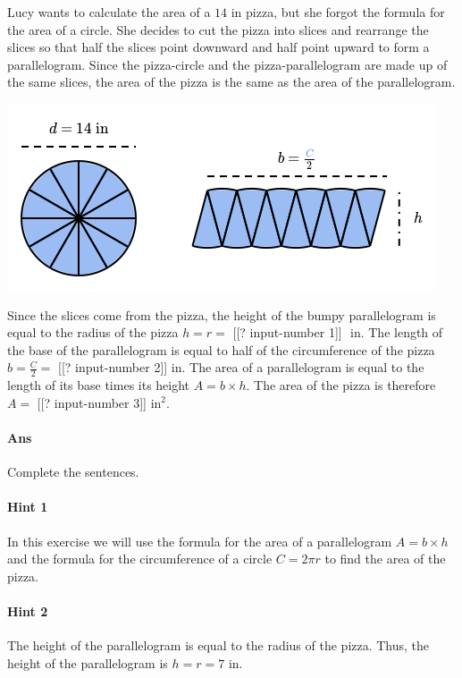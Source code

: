 \documentclass[twocolumn,10pt]{article}
\def\shrinkfactor{0.45}
\begin{document}
\noindent
Lucy wants to calculate the area of a $14\text{ in}$ pizza, but she forgot the formula for the area of a circle. She decides to cut the pizza into slices and rearrange the slices so that half the slices point downward and half point upward to form a parallelogram. Since the pizza-circle and the pizza-parallelogram are made up of the same slices, the area of the pizza is the same as the area of the parallelogram.


\includegraphics[scale=\shrinkfactor]{figures/26c47c40d180b9cf4072b9fd7b879e8d39d5d86a.png}

Since the slices come from the pizza, the height of the bumpy parallelogram is equal to the radius of the pizza  $h=r=$ [[? input-number 1]] $\text{ in}$.  
The length of the base of the parallelogram is equal to half of the circumference of the pizza $b=\frac{C}{2}=$  [[? input-number 2]]$\text{ in}$.  
The area of a parallelogram is equal to the length of its base times its height $A=b\times h$. The area of the pizza is therefore $A=$ [[? input-number 3]] $\text{in}^2$. 

\paragraph{Ans} Complete the sentences. 

\paragraph{Hint 1}In this exercise we will use the formula for the area of a parallelogram $A=b\times h$ and the formula for the circumference of a circle $C=2\pi r$ to find the area of the pizza.

\paragraph{Hint 2}The height of the parallelogram is equal to the radius  of the pizza. Thus, the height of the parallelogram is $h=r=7\text{ in}$.
\end{document}
